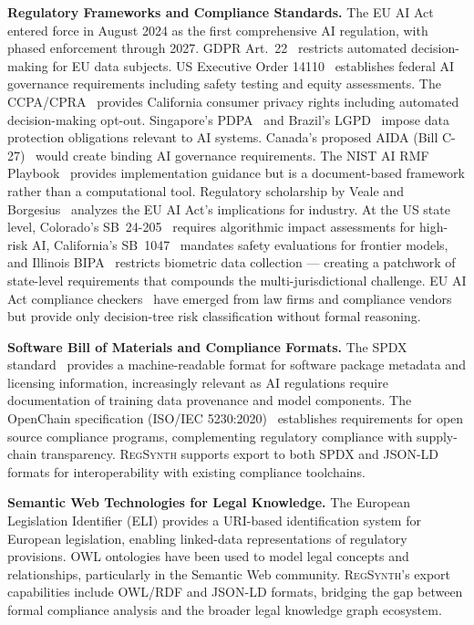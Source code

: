 \documentclass[11pt,twocolumn]{article}
\newcommand{\regsynth}{\textsc{RegSynth}}
\begin{document}
\textbf{Regulatory Frameworks and Compliance Standards.}
The EU AI Act~\cite{euaiact2024} entered force in August 2024 as the first
comprehensive AI regulation, with phased enforcement through 2027. GDPR
Art.~22~\cite{gdpr2016} restricts automated decision-making for EU data subjects.
US Executive Order 14110~\cite{useo14110} establishes federal AI governance
requirements including safety testing and equity assessments. The
CCPA/CPRA~\cite{ccpa2018} provides California consumer privacy rights including
automated decision-making opt-out. Singapore's PDPA~\cite{singaporepdpa} and
Brazil's LGPD~\cite{brazillgpd} impose data protection obligations relevant to
AI systems. Canada's proposed AIDA (Bill C-27)~\cite{canadaaida} would create
binding AI governance requirements. The NIST AI RMF
Playbook~\cite{nistrmfplaybook} provides implementation guidance but is a
document-based framework rather than a computational tool.
Regulatory scholarship by Veale and Borgesius~\cite{veale2021demystifying}
analyzes the EU AI Act's implications for industry.
At the US state level, Colorado's SB~24-205~\cite{coloradoaiact2024} requires
algorithmic impact assessments for high-risk AI, California's SB~1047~\cite{californiasb1047}
mandates safety evaluations for frontier models, and Illinois
BIPA~\cite{illinoisbipa} restricts biometric data collection — creating a
patchwork of state-level requirements that compounds the multi-jurisdictional
challenge. EU AI Act compliance checkers~\cite{euaicheckers} have emerged
from law firms and compliance vendors but provide only decision-tree risk
classification without formal reasoning.

\textbf{Software Bill of Materials and Compliance Formats.}
The SPDX standard~\cite{spdx2023} provides a machine-readable format for
software package metadata and licensing information, increasingly relevant as
AI regulations require documentation of training data provenance and model
components. The OpenChain specification (ISO/IEC 5230:2020)~\cite{openchain2020}
establishes requirements for open source compliance programs, complementing
regulatory compliance with supply-chain transparency. \regsynth{} supports
export to both SPDX and JSON-LD formats for interoperability with existing
compliance toolchains.

\textbf{Semantic Web Technologies for Legal Knowledge.}
The European Legislation Identifier (ELI) provides a URI-based identification
system for European legislation, enabling linked-data representations of
regulatory provisions. OWL ontologies have been used to model legal concepts
and relationships, particularly in the Semantic Web community. \regsynth{}'s
export capabilities include OWL/RDF and JSON-LD formats, bridging the gap
between formal compliance analysis and the broader legal knowledge graph
ecosystem.
\end{document}
